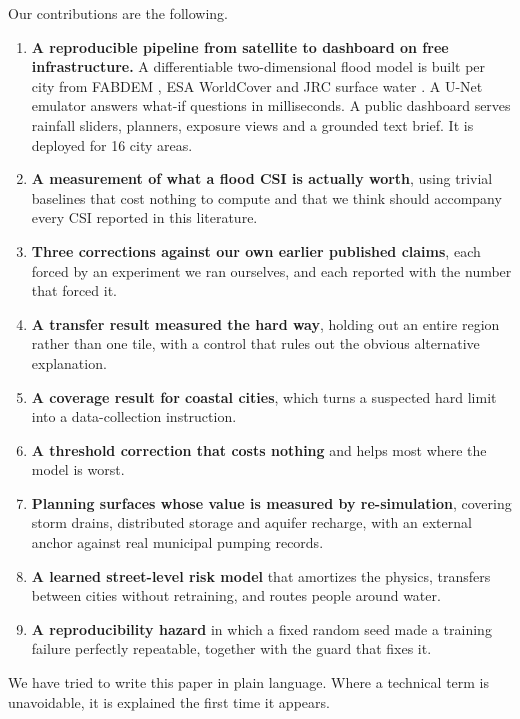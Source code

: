 \documentclass[journal]{IEEEtran}
\begin{document}
Our contributions are the following.

\begin{enumerate}
\item \textbf{A reproducible pipeline from satellite to dashboard on free infrastructure.} A
      differentiable two-dimensional flood model \cite{bates2010} is built per city from FABDEM
      \cite{hawker2022fabdem}, ESA WorldCover \cite{zanaga2021worldcover} and JRC surface water
      \cite{pekel2016}. A U-Net emulator \cite{ronneberger2015} answers what-if questions in
      milliseconds. A public dashboard serves rainfall sliders, planners, exposure views and a
      grounded text brief. It is deployed for 16 city areas.
\item \textbf{A measurement of what a flood CSI is actually worth}, using trivial baselines that
      cost nothing to compute and that we think should accompany every CSI reported in this
      literature.
\item \textbf{Three corrections against our own earlier published claims}, each forced by an
      experiment we ran ourselves, and each reported with the number that forced it.
\item \textbf{A transfer result measured the hard way}, holding out an entire region rather than one
      tile, with a control that rules out the obvious alternative explanation.
\item \textbf{A coverage result for coastal cities}, which turns a suspected hard limit into a
      data-collection instruction.
\item \textbf{A threshold correction that costs nothing} and helps most where the model is worst.
\item \textbf{Planning surfaces whose value is measured by re-simulation}, covering storm drains,
      distributed storage and aquifer recharge, with an external anchor against real municipal
      pumping records.
\item \textbf{A learned street-level risk model} that amortizes the physics, transfers between
      cities without retraining, and routes people around water.
\item \textbf{A reproducibility hazard} in which a fixed random seed made a training failure
      perfectly repeatable, together with the guard that fixes it.
\end{enumerate}

We have tried to write this paper in plain language. Where a technical term is unavoidable, it is
explained the first time it appears.
\end{document}
